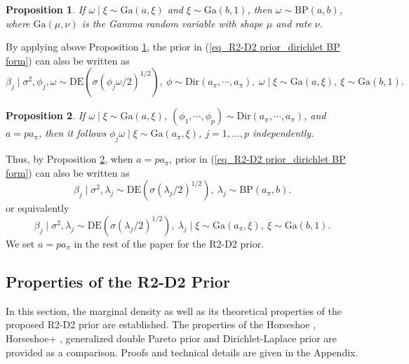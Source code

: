 \documentclass[12pt]{article}
\newtheorem{proposition}{Proposition}
\begin{document}
\begin{proposition}\label{proposition_1}
	If   $\omega\mid\xi \sim \text{Ga}(a, \xi) $ and $\xi\sim \text{Ga}(b, 1)$, then
	$\omega\sim\text{BP}(a,b)$, where $\text{Ga}(\mu, \nu)$ is the Gamma random variable with shape $\mu$ and rate $\nu$.
\end{proposition}

By applying above Proposition \ref{proposition_1},  the prior in (\ref{eq_R2-D2 prior_dirichlet BP form}) can also be written as
\[
\beta_j\mid\sigma^2,     \phi_j, \omega  \sim    \text{DE}( \sigma (\phi_j \omega/2)^{1/2} ),  \
{\phi} \sim \text{Dir}(a_\pi,\cdots,a_\pi), \
\omega\mid\xi \sim \text{Ga}(a, \xi), \  \xi\sim \text{Ga}(b, 1).
\]

\begin{proposition} \label{proposition_tauphi_j}
	If $\omega \mid \xi \sim \text{Ga}(a, \xi)$,  $(\phi_1,\cdots, \phi_p)\sim\text{Dir}(a_\pi,\cdots,a_\pi)$, and  $a = pa_\pi$, then    it follows  $ \phi_j  \omega \mid \xi \sim \text{Ga}(a_\pi,  \xi)$, $j=1,\dots, p$  independently.
\end{proposition}

Thus,  by Proposition  \ref{proposition_tauphi_j},   when $a=pa_\pi$,  prior in  (\ref{eq_R2-D2 prior_dirichlet BP form}) can also be written as
\begin{equation}   \label{eq_R2-D2 prior, linear model, simple representation}
\beta_j\mid\sigma^2,   \lambda_j    \sim   \text{DE}(\sigma (\lambda_j/2)^{1/2}),  \
\lambda_j \sim \text{BP}(a_\pi, b).
\end{equation}  or  equivalently
\begin{equation}   \label{eq_R2-D2 prior, linear model, simple representation1}
\beta_j\mid\sigma^2,   \lambda_j    \sim   \text{DE}(\sigma (\lambda_j/2)^{1/2}),  \
\lambda_j  \mid \xi \sim \text{Ga}(a_\pi, \xi), \
\xi \sim \text{Ga}(b,1) .
\end{equation}
We   set  $a=p a_\pi$ in  the rest of the paper for the R2-D2 prior.


\subsection{Properties of the R2-D2 Prior}\label{properties.sec}
In this section,  the marginal density as well as its theoretical properties of  the proposed  R2-D2  prior    are established.  The properties of the Horseshoe   \citep{carvalho2009handling,carvalho2010horseshoe}, Horseshoe+   \citep{bhadra2016horseshoe+}, generalized double Pareto prior   \citep{armagan2013generalized} and Dirichlet-Laplace  prior \citep{bhattacharya2015dirichlet}    are provided   as a comparison.
Proofs and technical details are given in the Appendix.
\end{document}
